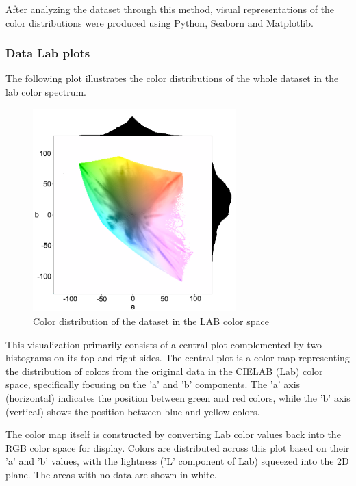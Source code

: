     After analyzing the dataset through this method, visual representations of the color distributions were produced using Python, Seaborn and Matplotlib. 
    
    \subsubsection{Data Lab plots}

    The following plot illustrates the color distributions of the whole dataset in the lab color spectrum.


    \begin{figure}[H]
        \centering
        \includegraphics[width=0.7\textwidth]{../code/dataAnalysis/plots/lab/DataCombined_lab_log.png}
        \caption{Color distribution of the dataset in the LAB color space}
        \label{fig:example}
    \end{figure}
    
    This visualization primarily consists of a central plot complemented by two histograms on its top and right sides. The central plot is a color map representing the distribution of colors from the original data in the CIELAB (Lab) color space, specifically focusing on the 'a' and 'b' components. The 'a' axis (horizontal) indicates the position between green and red colors, while the 'b' axis (vertical) shows the position between blue and yellow colors.

    The color map itself is constructed by converting Lab color values back into the RGB color space for display. Colors are distributed across this plot based on their 'a' and 'b' values, with the lightness ('L' component of Lab) squeezed into the 2D plane. The areas with no data are shown in white.

